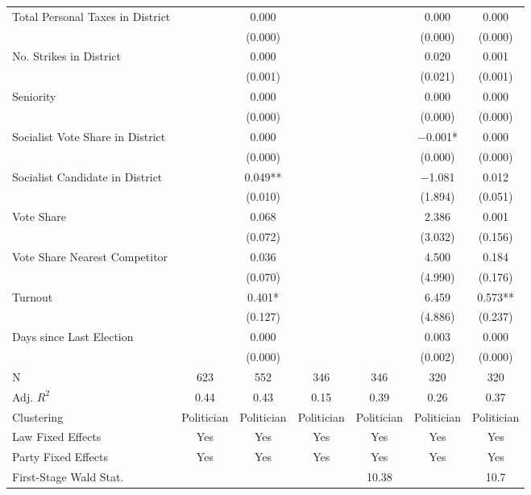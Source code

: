 \begin{table}[!h]
{\begin{threeparttable}
\begin{tabular}[t]{lcccccc}
Total Personal Taxes in District &  & \num{0.000} &  &  & \num{0.000} & \num{0.000}\\
 &  & (\num{0.000}) &  &  & (\num{0.000}) & \vphantom{2} (\num{0.000})\\
No. Strikes in District &  & \num{0.000} &  &  & \num{0.020} & \num{0.001}\\
 &  & (\num{0.001}) &  &  & (\num{0.021}) & (\num{0.001})\\
Seniority &  & \num{0.000} &  &  & \num{0.000} & \num{0.000}\\
 &  & (\num{0.000}) &  &  & (\num{0.000}) & \vphantom{1} (\num{0.000})\\
Socialist Vote Share in District &  & \num{0.000} &  &  & \num{-0.001}* & \num{0.000}\\
 &  & (\num{0.000}) &  &  & (\num{0.000}) & (\num{0.000})\\
Socialist Candidate in District &  & \num{0.049}** &  &  & \num{-1.081} & \num{0.012}\\
 &  & (\num{0.010}) &  &  & (\num{1.894}) & (\num{0.051})\\
Vote Share &  & \num{0.068} &  &  & \num{2.386} & \num{0.001}\\
 &  & (\num{0.072}) &  &  & (\num{3.032}) & (\num{0.156})\\
Vote Share Nearest Competitor &  & \num{0.036} &  &  & \num{4.500} & \num{0.184}\\
 &  & (\num{0.070}) &  &  & (\num{4.990}) & (\num{0.176})\\
Turnout &  & \num{0.401}* &  &  & \num{6.459} & \num{0.573}**\\
 &  & (\num{0.127}) &  &  & (\num{4.886}) & (\num{0.237})\\
Days since Last Election &  & \num{0.000} &  &  & \num{0.003} & \num{0.000}\\
 &  & (\num{0.000}) &  &  & (\num{0.002}) & (\num{0.000})\\
\midrule
N & \num{623} & \num{552} & \num{346} & \num{346} & \num{320} & \num{320}\\
Adj. $R^2$ & \num{0.44} & \num{0.43} & \num{0.15} & \num{0.39} & \num{0.26} & \num{0.37}\\
Clustering & Politician & Politician & Politician & Politician & Politician & Politician\\
Law Fixed Effects & Yes & Yes & Yes & Yes & Yes & Yes\\
Party Fixed Effects & Yes & Yes & Yes & Yes & Yes & Yes\\
First-Stage Wald Stat. &  &  &  & 10.38 &  & 10.7\\

\end{tabular}
\end{threeparttable}}
\end{table}
